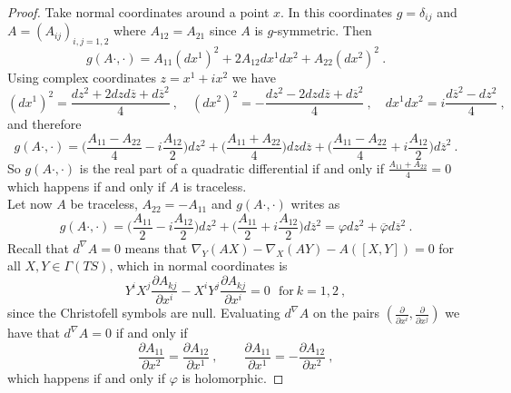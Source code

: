 \begin{proof}
    Take normal coordinates around a point $x$. In this coordinates $g=\delta_{ij}$ and $A = (A_{ij})_{i,j=1,2}$ where $A_{12}=A_{21}$ since $A$ is $g$-symmetric. Then
    \[
        g(A\cdot , \cdot) = A_{11} (dx^1)^2 + 2 A_{12} dx^1 dx^2 + A_{22} (dx^2)^2 \ .
    \]
    Using complex coordinates $z = x^1 + i x^2$ we have
    \[
        (dx^1)^2 = \frac{dz^2 + 2dzd\overline{z} + d\overline{z}^2}{4} \ , \quad (dx^2)^2 = -\frac{dz^2 - 2dzd\overline{z} + d\overline{z}^2}{4} \ , \quad dx^1dx^2 = i \frac{d\overline{z}^2 - dz^2}{4} \ ,
    \]
    and therefore
    \[
        g(A\cdot , \cdot) = \Big( \frac{A_{11} - A_{22}}{4} - i \frac{A_{12}}{2} \Big)dz^2 + \Big( \frac{A_{11} + A_{22}}{4} \Big)dzd\overline{z} +  \Big( \frac{A_{11} - A_{22}}{4} + i \frac{A_{12}}{2} \Big) d\overline{z}^2 \ .
    \]
    So $g(A\cdot , \cdot)$ is the real part of a quadratic differential if and only if $\frac{A_{11} + A_{22}}{4} = 0$ which happens if and only if $A$ is traceless.\\
    Let now $A$ be traceless, $A_{22}=- A_{11}$ and $g(A \cdot, \cdot)$ writes as
    \[
        g(A\cdot , \cdot) = \Big( \frac{A_{11}}{2} - i \frac{A_{12}}{2} \Big)dz^2 +  \Big( \frac{A_{11}}{2} + i \frac{A_{12}}{2} \Big) d\overline{z}^2 = \varphi dz^2 + \overline{\varphi} d \overline{z}^2 \ .
    \]
    Recall that $d^\nabla A = 0$ means that $\nabla_Y (AX) - \nabla_X (AY) - A(\left[X,Y\right]) = 0$ for all $X,Y \in \Gamma(TS)$, which in normal coordinates is
    \begin{equation}
        Y^i X^j \frac{\partial A_{kj}}{\partial x^i} - X^i Y^j \frac{\partial A_{kj}}{\partial x^i} = 0 \ \ \ \text{for} \ k = 1,2 \ ,
    \end{equation}
    since the Christofell symbols are null. Evaluating $d^\nabla A$ on the pairs $(\frac{\partial}{\partial x^i}, \frac{\partial}{\partial x^j})$ we have that $d^\nabla A = 0$ if and only if
    \[
        \frac{\partial A_{11}}{ \partial x^2} = \frac{\partial A_{12}}{ \partial x^1} \ , \qquad \frac{\partial A_{11}}{ \partial x^1} = - \frac{\partial A_{12}}{ \partial x^2} \ ,
    \]
    which happens if and only if $\varphi$ is holomorphic.
\end{proof}

